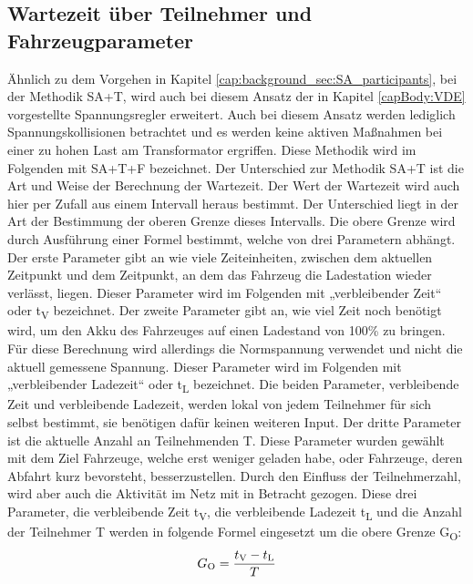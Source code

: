\subsection{Wartezeit über Teilnehmer und Fahrzeugparameter}
\label{cap:background_sec:SA_waitingTime}
Ähnlich zu dem Vorgehen in Kapitel \ref{cap:background_sec:SA_participants}, bei der Methodik SA+T, wird auch bei diesem Ansatz der in Kapitel \ref{capBody:VDE} vorgestellte Spannungsregler erweitert. Auch bei diesem Ansatz werden lediglich Spannungskollisionen betrachtet und es werden keine aktiven Maßnahmen bei einer zu hohen Last am Transformator ergriffen. Diese Methodik wird im Folgenden mit SA+T+F bezeichnet. Der Unterschied zur Methodik SA+T ist die Art und Weise der Berechnung der Wartezeit. Der Wert der Wartezeit wird auch hier per Zufall aus einem Intervall heraus bestimmt. Der Unterschied liegt in der Art der Bestimmung der oberen Grenze dieses Intervalls. Die obere Grenze wird durch Ausführung einer Formel bestimmt, welche von drei Parametern abhängt.  Der erste Parameter gibt an wie viele Zeiteinheiten, zwischen dem aktuellen Zeitpunkt und dem Zeitpunkt, an dem das Fahrzeug die Ladestation wieder verlässt, liegen. Dieser Parameter wird im Folgenden mit „verbleibender Zeit“ oder t\textsubscript{V} bezeichnet. Der zweite Parameter gibt an, wie viel Zeit noch benötigt wird, um den Akku des Fahrzeuges auf einen Ladestand von 100\% zu bringen. Für diese Berechnung wird allerdings die Normspannung verwendet und nicht die aktuell gemessene Spannung. Dieser Parameter wird im Folgenden mit „verbleibender Ladezeit“ oder t\textsubscript{L} bezeichnet. Die beiden Parameter, verbleibende Zeit und verbleibende Ladezeit, werden lokal von jedem Teilnehmer für sich selbst bestimmt, sie benötigen dafür keinen weiteren Input. Der dritte Parameter ist die aktuelle Anzahl an Teilnehmenden T. Diese Parameter wurden gewählt mit dem Ziel Fahrzeuge, welche erst weniger geladen habe, oder Fahrzeuge, deren Abfahrt kurz bevorsteht, besserzustellen. Durch den Einfluss der Teilnehmerzahl, wird aber auch die Aktivität im Netz mit in Betracht gezogen. Diese drei Parameter, die verbleibende Zeit t\textsubscript{V}, die verbleibende Ladezeit t\textsubscript{L} und die Anzahl der Teilnehmer T werden in folgende Formel eingesetzt um die obere Grenze G\textsubscript{O}:
\begin{align}
	G\textsubscript{O} = \frac{t\textsubscript{V} - t\textsubscript{L}}{T}
	\label{SA:formel4}
\end{align}
